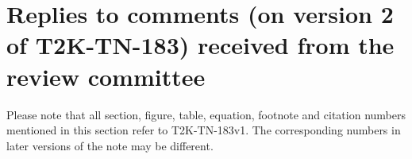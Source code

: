 \section{Replies to comments (on version 2 of T2K-TN-183) received from the review committee}

{\color{red}
Please note that all section, figure, table, equation, footnote and citation 
numbers mentioned in this section refer to T2K-TN-183v1. 
The corresponding numbers in later versions of the note may be different.
}


